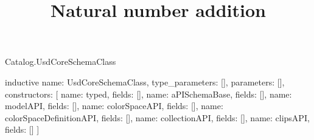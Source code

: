 \begin{lexlean}{Catalog.UsdCoreSchemaClass}
\title{Natural number addition}
\begin{semanticmodule}
inductive{
  name: UsdCoreSchemaClass,
  type_parameters: [],
  parameters: [],
  constructors: [
    {name: typed, fields: []},
    {name: aPISchemaBase, fields: []},
    {name: modelAPI, fields: []},
    {name: colorSpaceAPI, fields: []},
    {name: colorSpaceDefinitionAPI, fields: []},
    {name: collectionAPI, fields: []},
    {name: clipsAPI, fields: []}
  ]
}
\end{semanticmodule}
\end{lexlean}
